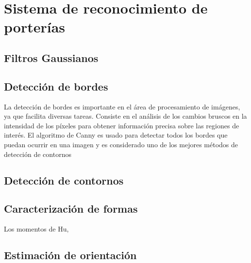 \chapter{Sistema de reconocimiento de porterías}\label{sec:porteria}

\section{Filtros Gaussianos}

\section{Detección de bordes}
La detección de bordes es importante en el área de procesamiento de imágenes, ya que facilita diversas tareas. Consiste en el análisis de los cambios bruscos en la intensidad de los píxeles para obtener información precisa sobre las regiones de interés.\cite{rebaza2007deteccion} El algoritmo de Canny es usado para detectar todos los bordes que puedan ocurrir en una imagen y es considerado uno de los mejores métodos de detección de contornos 

\section{Detección de contornos}

\section{Caracterización de formas}
Los momentos de Hu, 

\section{Estimación de orientación}